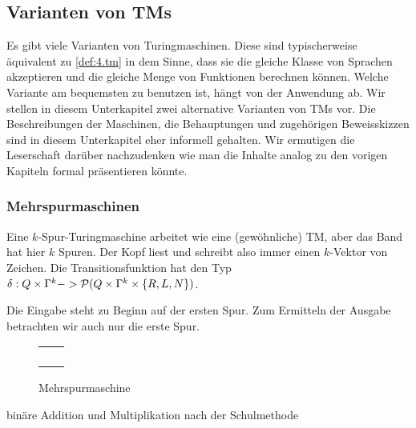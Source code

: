 \subsection{Varianten von \ac{TM}s}
Es gibt viele Varianten von Turingmaschinen.
Diese sind typischerweise äquivalent zu \autoref{def:4.tm} in dem Sinne, dass sie die gleiche Klasse von Sprachen akzeptieren und die gleiche Menge von Funktionen berechnen können.
Welche Variante am bequemsten zu benutzen ist, hängt von der Anwendung ab.
Wir stellen in diesem Unterkapitel zwei alternative Varianten von TMs vor.
Die Beschreibungen der Maschinen, die Behauptungen und zugehörigen Beweisskizzen sind in diesem Unterkapitel eher informell gehalten.
Wir ermutigen die Leserschaft darüber nachzudenken wie man die Inhalte analog zu den vorigen Kapiteln formal präsentieren könnte.


\subsubsection{Mehrspurmaschinen}

Eine $k$-Spur-Turingmaschine arbeitet wie eine (gewöhnliche) \ac{TM}, aber das Band hat hier $k$ Spuren.
Der Kopf liest und schreibt also immer einen $k$-Vektor von Zeichen.
Die Transitionsfunktion hat den Typ $\delta: Q\times\Gamma^k\--> \mathcal{P}(Q\times\Gamma^k\times\{R,L,N\})$.

Die Eingabe steht zu Beginn auf der ersten Spur.
Zum Ermitteln der Ausgabe betrachten wir auch nur die erste Spur.

	\begin{figure}[H]\centering
		{\renewcommand{\arraystretch}{0.8}
		\begin{tabu} to .5\textwidth {X[.35]|X[.65]}
			&\\\hline
			&\\\hline
			&\\\hline
			&\\\hline
			&
		\end{tabu}}
		\caption{Mehrspurmaschine}
	\end{figure}

	\begin{Bsp*}
		binäre Addition und Multiplikation nach der Schulmethode
	\end{Bsp*}

